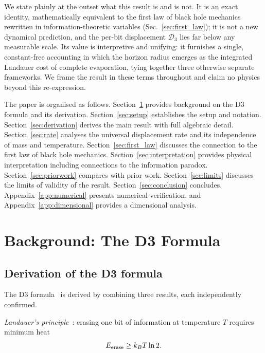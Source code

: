 \documentclass[aps,prd,twocolumn,showpacs,preprintnumbers,amsmath,amssymb,longbibliography]{revtex4-2}
\begin{document}
We state plainly at the outset what this result is and is not. It is an exact
identity, mathematically equivalent to the first law of black hole mechanics
rewritten in information-theoretic variables (Sec.~\ref{sec:first_law}); it is
not a new dynamical prediction, and the per-bit displacement $\mathcal{D}_3$
lies far below any measurable scale. Its value is interpretive and unifying: it
furnishes a single, constant-free accounting in which the horizon radius emerges
as the integrated Landauer cost of complete evaporation, tying together three
otherwise separate frameworks. We frame the result in these terms throughout and
claim no physics beyond this re-expression.

The paper is organised as follows. Section~\ref{sec:background} provides background on 
the D3 formula and its derivation. Section~\ref{sec:setup} establishes the setup and 
notation. Section~\ref{sec:derivation} derives the main result with full algebraic detail. 
Section~\ref{sec:rate} analyses the universal displacement rate and its independence of 
mass and temperature. Section~\ref{sec:first_law} discusses the connection to the first 
law of black hole mechanics. Section~\ref{sec:interpretation} provides physical 
interpretation including connections to the information paradox. 
Section~\ref{sec:priorwork} compares with prior work. Section~\ref{sec:limits} discusses 
the limits of validity of the result. Section~\ref{sec:conclusion} concludes. 
Appendix~\ref{app:numerical} presents numerical verification, and 
Appendix~\ref{app:dimensional} provides a dimensional analysis.

\section{Background: The D3 Formula}
\label{sec:background}

\subsection{Derivation of the D3 formula}

The D3 formula~\cite{sharma2026d3} is derived by combining three results, each 
independently confirmed.

\textit{Landauer's principle}~\cite{landauer1961,berut2012}: erasing one bit of 
information at temperature $T$ requires minimum heat 
\begin{equation}
E_{\rm erase} \geq k_B T \ln 2.
\label{eq:landauer}
\end{equation}
\end{document}
